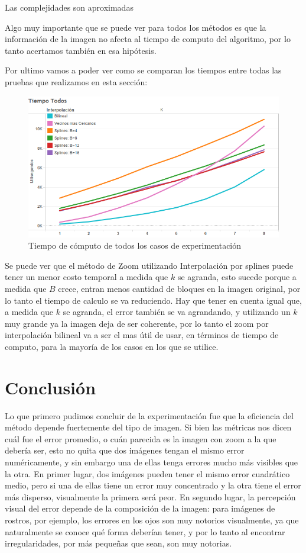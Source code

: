 \documentclass{article}
\begin{document}
Las complejidades son aproximadas\par\smallbreak

Algo muy importante que se puede ver para todos los métodos es que la información de la imagen no afecta al tiempo de computo del algoritmo, por lo tanto acertamos también en esa hipótesis.\smallbreak

Por ultimo vamos a poder ver como se comparan los tiempos entre todas las pruebas que realizamos en esta sección:

\begin{figure}[H]
\centering
\includegraphics[scale=0.8]{BI-Time-All.png}
\caption{Tiempo de cómputo de todos los casos de experimentación}
\label{fig:BI-time-Splines}
\end{figure}

Se puede ver que el método de Zoom utilizando Interpolación por splines puede tener un menor costo temporal a medida que $k$ se agranda, esto sucede porque a medida que $B$ crece, entran menos cantidad de bloques en la imagen original, por lo tanto el tiempo de calculo se va reduciendo. Hay que tener en cuenta igual que, a medida que $k$ se agranda, el error también se va agrandando, y utilizando un $k$ muy grande ya la imagen deja de ser coherente, por lo tanto el zoom por interpolación bilineal va a ser el mas útil de usar, en términos de tiempo de computo, para la mayoría de los casos en los que se utilice.

\section{Conclusión}

Lo que primero pudimos concluir de la experimentación fue que la eficiencia del método depende fuertemente del tipo de imagen. Si bien las métricas nos dicen cuál fue el error promedio, o cuán parecida es la imagen con zoom a la que debería ser, esto no quita que dos imágenes tengan el mismo error numéricamente, y sin embargo una de ellas tenga errores mucho más visibles que la otra. En primer lugar, dos imágenes pueden tener el mismo error cuadrático medio, pero si una de ellas tiene un error muy concentrado y la otra tiene el error más disperso, visualmente la primera será peor. En segundo lugar, la percepción visual del error depende de la composición de la imagen: para imágenes de rostros, por ejemplo, los errores en los ojos son muy notorios visualmente, ya que naturalmente se conoce qué forma deberían tener, y por lo tanto al encontrar irregularidades, por más pequeñas que sean, son muy notorias.
\end{document}
